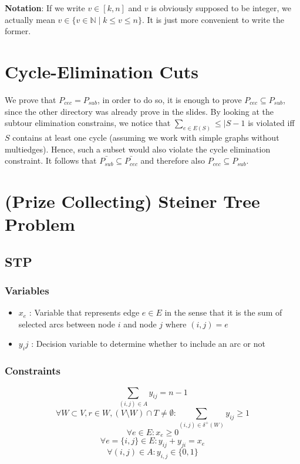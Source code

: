 \documentclass{article}
\begin{document}
\sloppy


\textbf{Notation}: If we write $ v \in [k,n] $ and $v$ is obviously supposed to be integer, we actually mean $v \in \{v \in \mathbb{N} \mid k \leq v \leq n\}$. It is just more convenient to write the former.

\section{Cycle-Elimination Cuts}

We prove that $P_{cec} = P_{sub}$, in order to do so, it is enough to prove $P_{cec} \subseteq P_{sub}$, since the other directory was already prove in the slides. By looking at the subtour elimination constrains, we notice that $\sum_{e \in E(S)} \leq \vert{S} - 1$ is violated iff $S$ contains at least one cycle (assuming we work with simple graphs without multiedges). Hence, such a subset would also violate the cycle elimination constraint. It follows that $\bar{P_{sub}} \subseteq \bar{P_{cec}}$ and therefore also $P_{cec} \subseteq P_{sub}$.

\clearpage

\section{(Prize Collecting) Steiner Tree Problem}

\subsection{STP}

\subsubsection{Variables}
\begin{itemize}
	\item $x_e$ : Variable that represents edge $e \in E$ in the sense that it is the sum of selected arcs between node $i$ and node $j$ where $(i,j) = e$ 
	\item $y_ij$ : Decision variable to determine whether to include an arc or not
\end{itemize}

\subsubsection{Constraints}
\[ \sum_{(i,j)\in A}y_{ij} = n-1 \]
\[ \forall W \subset V, r \in W, (V \setminus W) \cap T \neq \emptyset : \sum_{(i,j)\in \delta^+(W)}y_{ij} \geq 1 \]
\[ \forall e \in E : x_e \geq 0 \]
\[ \forall e = \{i,j\} \in E : y_{ij} + y_{ji} = x_e \]
\[ \forall (i,j) \in A : y_{i,j} \in \{0,1\} \]
\end{document}
